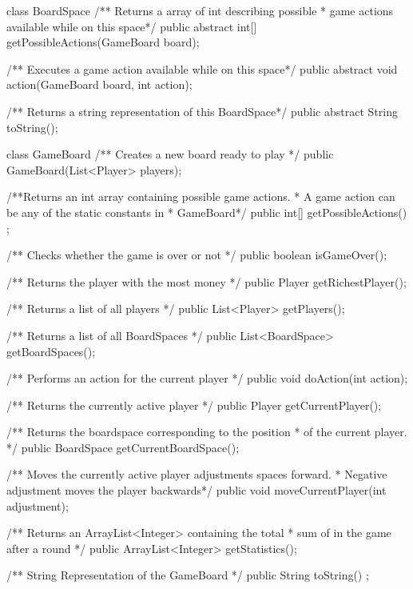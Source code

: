 \begin{JavaSpec}{class BoardSpace}
    /** Returns a array of int describing possible
      * game actions available while on this space*/
    public abstract int[] getPossibleActions(GameBoard board);

    /** Executes a game action available while on this space*/
    public abstract void action(GameBoard board, int action);

    /** Returns a string representation of this BoardSpace*/
    public abstract String toString();
\end{JavaSpec}

\begin{JavaSpec}{class GameBoard}
    /** Creates a new board ready to play */
    public GameBoard(List<Player> players);

    /**Returns an int array containing possible game actions.
     * A game action can be any of the static constants in
     * GameBoard*/
    public int[] getPossibleActions() ;
    
    /** Checks whether the game is over or not */
    public boolean isGameOver();
    
    /** Returns the player with the most money */
    public Player getRichestPlayer();

    /** Returns a list of all players */
    public List<Player> getPlayers();

    /** Returns a list of all BoardSpaces */
    public List<BoardSpace> getBoardSpaces();

    /** Performs an action for the current player */
    public void doAction(int action);
 
    /** Returns the currently active player */
    public Player getCurrentPlayer();

    /** Returns the boardspace corresponding to the position 
      * of the current player. */
    public BoardSpace getCurrentBoardSpace();

    /** Moves the currently active player adjustments spaces forward.
      * Negative adjustment moves the player backwards*/
    public void moveCurrentPlayer(int adjustment);
    
     /** Returns an ArrayList<Integer> containing the total
     *  sum of in the game after a round */
    public ArrayList<Integer> getStatistics();

    /** String Representation of the GameBoard */
    public String toString() ;
\end{JavaSpec}

